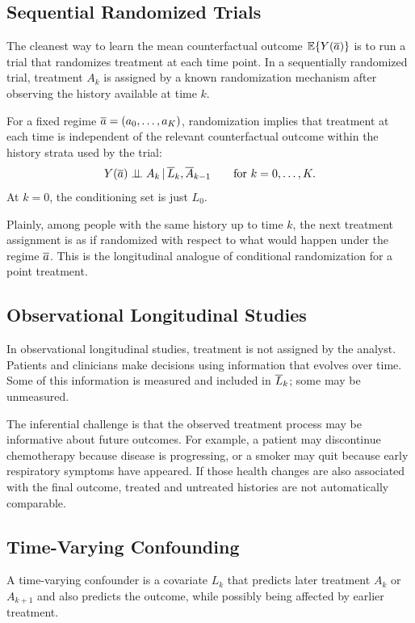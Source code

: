\label{lec:8-2}

\subsection{Sequential Randomized Trials}

The cleanest way to learn the mean counterfactual outcome $\mathbb{E}\{Y(\overline{a})\}$ is
to run a trial that randomizes treatment at each time point. In a sequentially
randomized trial, treatment $A_k$ is assigned by a known randomization mechanism
after observing the history available at time $k$.

For a fixed regime $\overline{a}=(a_0,\ldots,a_K)$, randomization implies that treatment
at each time is independent of the relevant counterfactual outcome within the
history strata used by the trial:
\[
  Y(\overline{a}) \perp\!\!\!\perp A_k \,\vert\, \overline{L}_k,\overline{A}_{k-1}
  \qquad \text{for } k=0,\ldots,K.
\]
At $k=0$, the conditioning set is just $L_0$.

Plainly, among people with the same history up to time $k$, the next treatment
assignment is as if randomized with respect to what would happen under the
regime $\overline{a}$. This is the longitudinal analogue of conditional randomization
for a point treatment.

\subsection{Observational Longitudinal Studies}

In observational longitudinal studies, treatment is not assigned by the analyst.
Patients and clinicians make decisions using information that evolves over time.
Some of this information is measured and included in $\overline{L}_k$; some may be
unmeasured.

The inferential challenge is that the observed treatment process may be
informative about future outcomes. For example, a patient may discontinue
chemotherapy because disease is progressing, or a smoker may quit because early
respiratory symptoms have appeared. If those health changes are also associated
with the final outcome, treated and untreated histories are not automatically
comparable.

\subsection{Time-Varying Confounding}

\begin{definition}
A time-varying confounder is a covariate $L_k$ that predicts later treatment
$A_k$ or $A_{k+1}$ and also predicts the outcome, while possibly being affected
by earlier treatment.
\end{definition}

